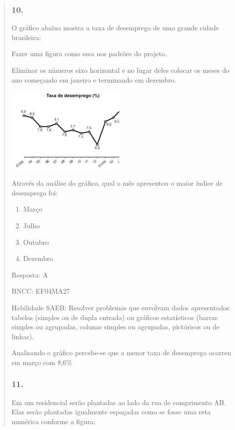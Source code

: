 \begin{enumerate}
\begin{escolha}
\begin{enumerate}
\begin{itemize}
\begin{itemize}
\begin{escolha}
\begin{quote}
\begin{escolha}
{\subsubsection{10.}\label{section-151}

O gráfico abaixo mostra a taxa de desemprego de uma grande cidade
brasileira:

Fazer uma figura como essa nos padrões do projeto.

Eliminar os números eixo horizontal e no lugar deles colocar os meses do
ano começando em janeiro e terminando em dezembro.

\includegraphics[width=2.29697in,height=1.66026in]{media/image146.png}

Através da análise do gráfico, qual o mês apresentou o maior índice de
desemprego foi:

\begin{enumerate}
\def\labelenumi{\alph{enumi})}
\item
  Março
\item
  Julho
\item
  Outubro
\item
  Dezembro
\end{enumerate}

Resposta: A

BNCC: EF04MA27

Habilidade SAEB: Resolver problemas que envolvam dados apresentados
tabelas (simples ou de dupla entrada) ou gráficos estatísticos (barras
simples ou agrupadas, colunas simples ou agrupadas, pictóricos ou de
linhas).

Analisando o gráfico percebe-se que a menor taxa de desemprego ocorreu
em março com 8,6\%

\subsubsection{11.}\label{section-152}

Em um residencial serão plantadas ao lado da rua de comprimento AB. Elas
serão plantadas igualmente espaçadas como se fosse uma reta numérica
conforme a figura:

}
\end{escolha}
\end{quote}
\end{escolha}
\end{itemize}
\end{itemize}
\end{enumerate}
\end{escolha}
\end{enumerate}
